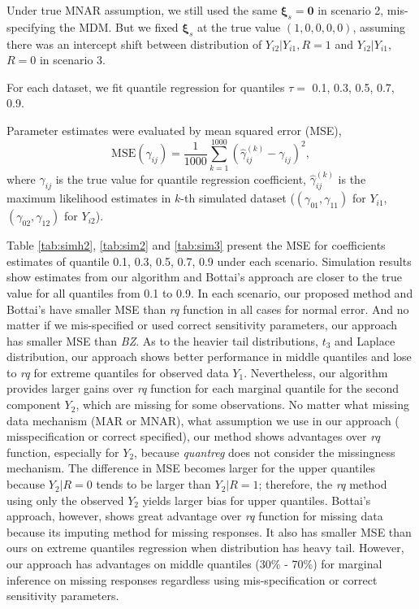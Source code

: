 \documentclass[12pt]{article}
\begin{document}
Under true MNAR assumption, we still used the same $\bm \xi_s = \bm 0$
in scenario 2, mis-specifying the MDM. But we fixed $\bm \xi_s$ at the
true value $(1, 0, 0, 0, 0)$, assuming there was an intercept shift
between distribution of $Y_{i2}|Y_{i1}, R = 1$ and $Y_{i2}|Y_{i1}$, $R
= 0$ in scenario 3.

For each dataset, we fit quantile regression for quantiles $\tau =$
0.1, 0.3, 0.5, 0.7, 0.9.

Parameter estimates were evaluated by mean squared error (MSE),
\begin{equation*}
  \text{MSE} (\gamma_{ij}) = \frac{1}{1000} \sum_{k = 1}^{1000}
  \left( \hat{\gamma}_{ij}^{(k)}  - \gamma_{ij}\right)^2,
\end{equation*}
where $\gamma_{ij}$ is the true value for quantile regression
coefficient, $\hat{\gamma}_{ij}^{(k)}$ is the maximum likelihood
estimates in $k$-th simulated dataset ($(\gamma_{01}, \gamma_{11})$
for $Y_{i1}$, $(\gamma_{02}, \gamma_{12})$ for $Y_{i2}$).

Table \ref{tab:simh2}, \ref{tab:sim2} and \ref{tab:sim3} present the
MSE for coefficients estimates of quantile 0.1, 0.3, 0.5, 0.7, 0.9
under each scenario.  Simulation results show estimates from our
algorithm and Bottai's approach are closer to the true value for all
quantiles from 0.1 to 0.9.  In each scenario, our proposed method and
Bottai's have smaller MSE than \textit{rq} function in all cases for
normal error. And no matter if we mis-specified or used correct
sensitivity parameters, our approach has smaller MSE than \textit{BZ}.
As to the heavier tail distributions, $t_3$ and Laplace distribution,
our approach shows better performance in middle quantiles and lose to
\textit{rq} for extreme quantiles for observed data
$Y_1$. Nevertheless, our algorithm provides larger gains over
\textit{rq} function for each marginal quantile for the second
component $Y_2$, which are missing for some observations.  No matter
what missing data mechanism (MAR or MNAR), what assumption we use in
our approach ( misspecification or correct specified), our method
shows advantages over \textit{rq} function, especially for $Y_2$,
because \textit{quantreg} does not consider the missingness
mechanism. The difference in MSE becomes larger for the upper
quantiles because $Y_2 |R = 0$ tends to be larger than $Y_2 | R = 1$;
therefore, the \textit{rq} method using only the observed $Y_2$ yields
larger bias for upper quantiles.  Bottai's approach, however, shows
great advantage over \textit{rq} function for missing data because its
imputing method for missing responses.  It also has smaller MSE than
ours on extreme quantiles regression when distribution has heavy
tail. However, our approach has advantages on middle quantiles (30\% -
70\%) for marginal inference on missing responses regardless using
mis-specification or correct sensitivity parameters.
\end{document}

